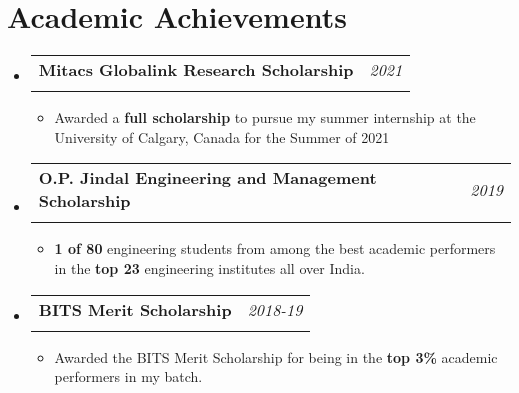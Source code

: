 \documentclass[a4paper,11pt]{article}
\makeatletter
\newcommand{\resumeItem}[1]{
  \item\small{
    {#1 \vspace{-2pt}}
  }
}
\newcommand{\resumeSubheading}[4]{
  \vspace{-2pt}\item
    \begin{tabular*}{0.97\textwidth}[t]{l@{\extracolsep{\fill}}r}
      \textbf{#1} & #2 \\
      \textit{\small#3} & \textit{\small #4} \\
    \end{tabular*}\vspace{-7pt}
}
\newcommand{\resumeSubHeadingListStart}{\begin{itemize}[leftmargin=0.15in, label={}]}
\newcommand{\resumeSubHeadingListEnd}{\end{itemize}}
\newcommand{\resumeItemListStart}{\begin{itemize}}
\newcommand{\resumeItemListEnd}{\end{itemize}\vspace{-5pt}}
\makeatother
\begin{document}
\section{Academic Achievements}
  \resumeSubHeadingListStart
  \vspace{-2mm}
    \resumeSubheading
      {Mitacs Globalink Research Scholarship}{\textit{2021}}
      {}{}
      \vspace{-3mm}
      \resumeItemListStart
        \resumeItem{Awarded a \textbf{full scholarship} to pursue my summer internship at the University of Calgary, Canada for the Summer of 2021}
      \resumeItemListEnd
            \vspace{1mm}
    \resumeSubheading
      {O.P. Jindal Engineering and Management Scholarship}{\textit{2019}}
      {}{}
       \vspace{-3mm}
      \resumeItemListStart
        \resumeItem{\textbf{1 of 80} engineering students from among the best academic performers in the \textbf{top 23} engineering institutes all over India.}
      \resumeItemListEnd
      \vspace{1mm}
    \resumeSubheading
      {BITS Merit Scholarship}{\textit{2018-19}}
      {}{}
       \vspace{-3mm}
      \resumeItemListStart
        \resumeItem{Awarded the BITS Merit Scholarship for being in the \textbf{top 3\%} academic performers in my batch.}
      \resumeItemListEnd
      \vspace{-3mm}
  \resumeSubHeadingListEnd



\end{document}
